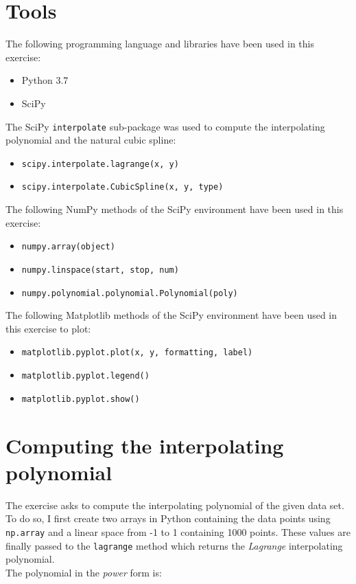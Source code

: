 \documentclass{article}
\newcommand{\code}{\texttt}
\begin{document}
\section{Tools}
The following programming language and libraries have been used in this exercise:
\begin{itemize}
  \item Python 3.7
  \item SciPy
\end{itemize}
The SciPy \code{interpolate} sub-package was used to compute the interpolating polynomial and the natural cubic spline:
\begin{itemize}
  \item \code{scipy.interpolate.lagrange(x, y)}
  \item \code{scipy.interpolate.CubicSpline(x, y, type)}
\end{itemize}

The following NumPy methods of the SciPy environment have been used in this exercise:
\begin{itemize}
  \item \code{numpy.array(object)}
  \item \code{numpy.linspace(start, stop, num)}
  \item \code{numpy.polynomial.polynomial.Polynomial(poly)}
  \end{itemize}
The following Matplotlib methods of the SciPy environment have been used in this exercise to plot:
 \begin{itemize}
  \item \code{matplotlib.pyplot.plot(x, y, formatting, label)}
  \item \code{matplotlib.pyplot.legend()}
  \item \code{matplotlib.pyplot.show()}
  \end{itemize}
  
\section{Computing the interpolating polynomial}
The exercise asks to compute the interpolating polynomial of the given data set. To do so, I first create two arrays in Python containing the data points using \code{np.array} and a linear space from -1 to 1 containing 1000 points. These values are finally passed to the \code{lagrange} method which returns the {\it Lagrange} interpolating polynomial. \\

The polynomial in the {\it power} form is: \\
\end{document}
